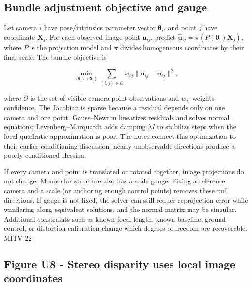 \subsection{Bundle adjustment objective and gauge}\label{04-visual-computing-ii-ch032-bundle-adjustment-objective-and-gauge}

\hypertarget{04-visual-computing-ii-ch032-bundle-adjustment-objective-and-gauge}{}

Let camera \(i\) have pose/intrinsics parameter vector \(\boldsymbol\theta_i\), and point \(j\) have coordinate \(\mathbf X_j\). For each observed image point \(\mathbf u_{ij}\), predict \(\hat{\mathbf u}_{ij}=\pi(P(\boldsymbol\theta_i)\mathbf X_j)\), where \(P\) is the projection model and \(\pi\) divides homogeneous coordinates by their final scale. The bundle objective is

\[
\min_{\{\boldsymbol\theta_i\},\{\mathbf X_j\}}\sum_{(i,j)\in\mathcal O}w_{ij}\|\mathbf u_{ij}-\hat{\mathbf u}_{ij}\|^2,
\]

where \(\mathcal O\) is the set of visible camera-point observations and \(w_{ij}\) weights confidence. The Jacobian is sparse because a residual depends only on one camera and one point. Gauss--Newton linearizes residuals and solves normal equations; Levenberg--Marquardt adds damping \(\lambda I\) to stabilize steps when the local quadratic approximation is poor. The notes connect this optimization to their earlier conditioning discussion: nearly unobservable directions produce a poorly conditioned Hessian.

If every camera and point is translated or rotated together, image projections do not change. Monocular structure also has a scale gauge. Fixing a reference camera and a scale (or anchoring enough control points) removes these null directions. If gauge is not fixed, the solver can still reduce reprojection error while wandering along equivalent solutions, and the normal matrix may be singular. Additional constraints such as known focal length, known baseline, ground control, or distortion calibration change which degrees of freedom are recoverable. \hyperref[04-visual-computing-ii-ch036-mitv-22---exterior-orientation-recovering-position-orientation-bundle-adjustment-object-shape]{MITV-22}

\subsection{Figure U8 - Stereo disparity uses local image coordinates}\label{04-visual-computing-ii-ch032-figure-u8---stereo-disparity-uses-local-image-coordinates}

